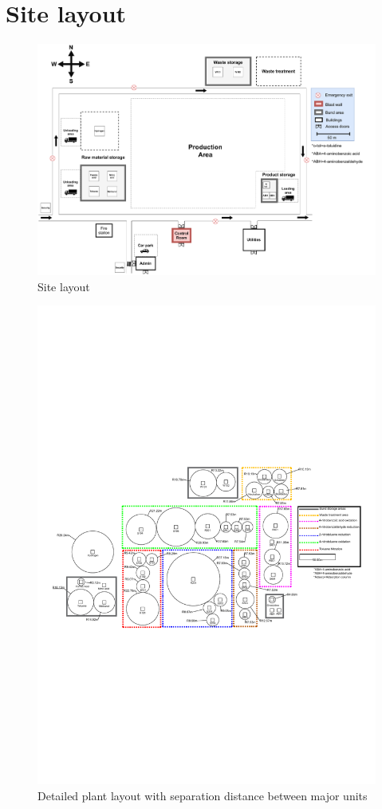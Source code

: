 \section{Site layout}

\begin{figure}[H]
    \centering
    \includegraphics[width=\linewidth]{chapters/Z-support/figures/Plant layout.pdf}
    \caption{Site layout}
    \label{fig:site}
\end{figure}

\begin{figure}[H]
    \centering
    \includegraphics[width=\linewidth]{chapters/Z-support/figures/Separation distances 2.pdf}
    \caption{Detailed plant layout with separation distance between major units}
    \label{fig:detailed_layout}
\end{figure}